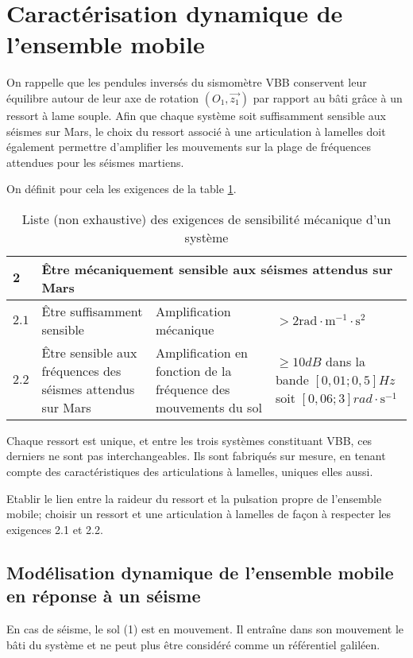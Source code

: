 \section{Caractérisation dynamique de l'ensemble mobile}
\ifprof
\else

On rappelle que les pendules inversés du sismomètre VBB conservent leur équilibre autour de leur axe de rotation $\left(O_{1}, \overrightarrow{z_{1}}\right)$ par rapport au bâti grâce à un ressort à lame souple. Afin que chaque système soit suffisamment sensible aux séismes sur Mars, le choix du ressort associé à une articulation à lamelles doit également permettre d'amplifier les mouvements sur la plage de fréquences attendues pour les séismes martiens.

On définit pour cela les exigences de la table \ref{ccmp2023_tab_02}.
\fi

\begin{table}[!h]
\centering
\begin{tabular}{lp{5cm}p{5cm}p{4cm}}
\hline
$\mathbf{2}$ &\multicolumn{3}{l}{Être mécaniquement sensible aux séismes attendus sur Mars} \\
\hline
$\mathbf{2.1}$ & Être suffisamment sensible & Amplification mécanique & $>2 \mathrm{rad} \cdot \mathrm{m}^{-1} \cdot \mathrm{s}^{2}$ \\
\hline
$\mathbf{2.2}$ & Être sensible aux fréquences des séismes attendus sur Mars & 
Amplification en fonction de la fréquence des mouvements du sol & $\geq 10 \si{dB}$ dans la bande $[0,01 ; 0,5] \si{Hz}$ soit $[0,06 ; 3] \si{rad} \cdot \mathrm{s}^{-1}$  \\
\hline
\end{tabular}
\caption{Liste (non exhaustive) des exigences de sensibilité mécanique d'un système \label{ccmp2023_tab_02}}
\end{table}

\ifprof
\else

Chaque ressort est unique, et entre les trois systèmes constituant VBB, ces derniers ne sont pas interchangeables. Ils sont fabriqués sur mesure, en tenant compte des caractéristiques des articulations à lamelles, uniques elles aussi.
\fi

\begin{obj}
Etablir le lien entre la raideur du ressort et la pulsation propre de l'ensemble mobile; choisir un ressort et une articulation à lamelles de façon à respecter les exigences 2.1 et 2.2.
\end{obj}


\subsection{Modélisation dynamique de l'ensemble mobile en réponse à un séisme}
\ifprof
\else
En cas de séisme, le sol (1) est en mouvement. Il entraîne dans son mouvement le bâti du système et ne peut plus être considéré comme un référentiel galiléen.

